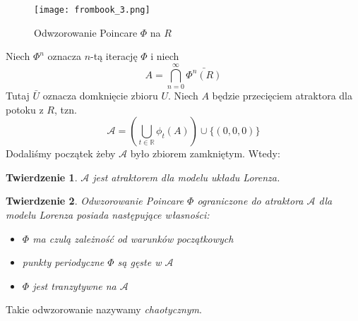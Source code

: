 \documentclass[12pt]{report}
\newtheorem{theorem}{Twierdzenie}
\newcommand{\R}{\mathbb{R}}
\begin{document}
	\begin{figure}[H]
		\centering
		\texttt{[image: frombook\_3.png]}
		\caption{Odwzorowanie Poincare $\Phi$ na $R$}
		\label{fig:frombook_3}
	\end{figure}
	\par Niech $\Phi^n$ oznacza $n$-tą iterację $\Phi$ i niech
		\[ A = \bigcap\limits^{\infty}_{n=0} \bar{\Phi^n(R)} \]
	Tutaj $\bar{U}$ oznacza domknięcie zbioru $U$. Niech $A$ będzie przecięciem atraktora dla potoku z $R$, tzn.
		\[ \mathcal{A} = (\bigcup\limits_{t \in \R} \phi_t(A)) \cup \{(0, 0, 0)\} \]
	Dodaliśmy początek żeby $\mathcal{A}$ było zbiorem zamkniętym. Wtedy:
	\begin{theorem}
		$\mathcal{A}$ jest atraktorem dla modelu układu Lorenza.
	\end{theorem}
	\begin{theorem}
		Odwzorowanie Poincare $\Phi$ ograniczone do atraktora $\mathcal{A}$ dla modelu Lorenza posiada następujące własności:
		\begin{itemize}
			\item $\Phi$ ma czulą zależność od warunków początkowych
			\item punkty periodyczne $\Phi$ są gęste w $\mathcal{A}$
			\item $\Phi$ jest tranzytywne na $\mathcal{A}$
		\end{itemize}
	\end{theorem}
	Takie odwzorowanie nazywamy \textit{chaotycznym}.
\end{document}

